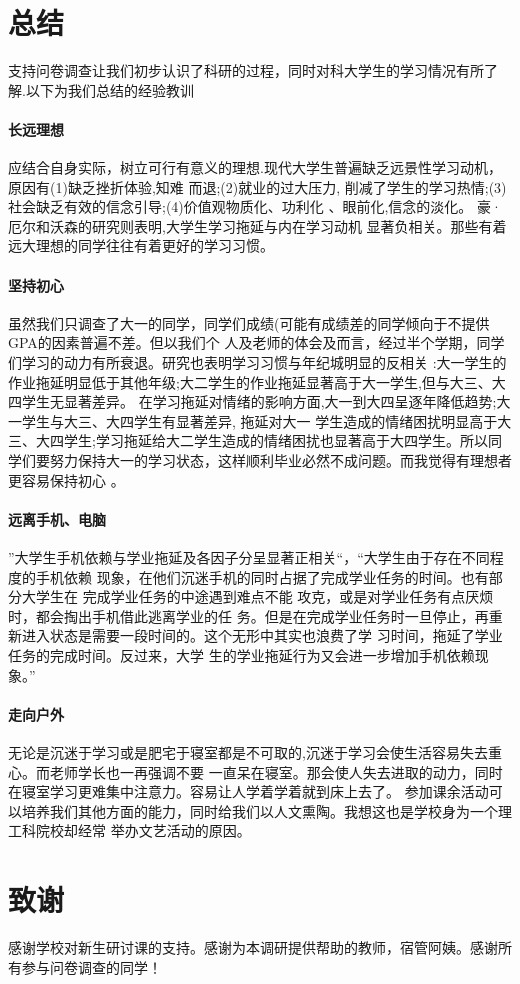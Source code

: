 \documentclass[UTF8]{ctexart}
\begin{document}
\section{总结}
支持问卷调查让我们初步认识了科研的过程，同时对科大学生的学习情况有所了解.以下为我们总结的经验教训
\paragraph{长远理想}
应结合自身实际，树立可行有意义的理想.现代大学生普遍缺乏远景性学习动机，原因有(1)缺乏挫折体验,知难
而退;(2)就业的过大压力, 削减了学生的学习热情;(3)社会缺乏有效的信念引导;(4)价值观物质化、功利化
、眼前化,信念的淡化\cite{learninggoal}。 豪·厄尔和沃森的研究则表明,大学生学习拖延与内在学习动机
显著负相关\cite{delay}。那些有着远大理想的同学往往有着更好的学习习惯。
\paragraph{坚持初心}
虽然我们只调查了大一的同学，同学们成绩(可能有成绩差的同学倾向于不提供GPA的因素普遍不差。但以我们个
人及老师的体会及而言，经过半个学期，同学们学习的动力有所衰退。研究也表明学习习惯与年纪城明显的反相关
:大一学生的作业拖延明显低于其他年级;大二学生的作业拖延显著高于大一学生,但与大三、大四学生无显著差异。
在学习拖延对情绪的影响方面,大一到大四呈逐年降低趋势;大一学生与大三、大四学生有显著差异, 拖延对大一
学生造成的情绪困扰明显高于大三、大四学生;学习拖延给大二学生造成的情绪困扰也显著高于大四学生\cite{
delay}。所以同学们要努力保持大一的学习状态，这样顺利毕业必然不成问题。而我觉得有理想者更容易保持初心
。
\paragraph{远离手机、电脑}
”大学生手机依赖与学业拖延及各因子分呈显著正相关“\cite{phone}，“大学生由于存在不同程度的手机依赖
现象，在他们沉迷手机的同时占据了完成学业任务的时间。也有部分大学生在 完成学业任务的中途遇到难点不能
攻克，或是对学业任务有点厌烦时，都会掏出手机借此逃离学业的任 务。但是在完成学业任务时一旦停止，再重
新进入状态是需要一段时间的。这个无形中其实也浪费了学 习时间，拖延了学业任务的完成时间。反过来，大学
生的学业拖延行为又会进一步增加手机依赖现象。”\cite{phone}
\paragraph{走向户外}
无论是沉迷于学习或是肥宅于寝室都是不可取的,沉迷于学习会使生活容易失去重心。而老师学长也一再强调不要
一直呆在寝室。那会使人失去进取的动力，同时在寝室学习更难集中注意力。容易让人学着学着就到床上去了。
参加课余活动可以培养我们其他方面的能力，同时给我们以人文熏陶。我想这也是学校身为一个理工科院校却经常
举办文艺活动的原因。

\section{致谢}
感谢学校对新生研讨课的支持。感谢为本调研提供帮助的教师，宿管阿姨。感谢所有参与问卷调查的同学！



\end{document}
